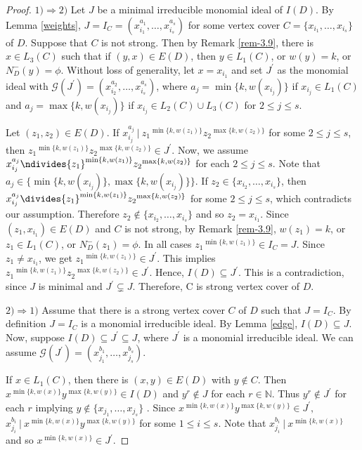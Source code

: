 \documentclass[11pt,reqno]{amsart}
\theoremstyle{definition}
\begin{document}
\begin{proof}
$ 1) \Rightarrow  2)$  Let $ J $ be a minimal irreducible monomial ideal of $ I(D) $. By  Lemma \ref{weights}, $J =I_C= (x^{a_1}_
{i_1} ,\ldots, x^{a_s}_
{i_s})$ for some vertex cover $C = \{x_
{i_1} ,\ldots, x_
{i_s}\}$ of $D$. Suppose that $C$ is not strong. Then by Remark \ref{rem-3.9}, there is $ x \in L_3(C) $ such that if $ (y, x) \in E(D) $, then
$ y   \in L_1(C) $, or   $ w(y) = k $, or $  N_D^-(y) = \phi $. 	 Without loss of generality, let $ x = x_{i_1} $  and set $ J^{\prime} $ as the monomial ideal
with $ \mathcal{G}(J^{\prime}) = ( x_{i_2}^{a_2}, \ldots, x_{i_s}^{a_s} )$,  where $a_j = {\min\{k,  w(x_{i_j}) \}}$   if $  x_{i_j} \in  L_1(C) $ and $a_j =      {\max\{k, w(x_{i_j})\}}$ if $x_{i_j} \in  L_2(C) \cup L_3(C)  $ for $ 2 \leq j \leq s$.


  Let $ (z_1, z_2) \in E(D) $. If $ x_{i_j}^{a_j}
  ~|~  {z_1}^{\min\{k,w(z_1)\}}{z_2}^{\max\{k,w(z_2)\}} $
 for some $ 2 \leq j \leq s $,
then  $   {z_1}^{\min\{k,w(z_1)\}}{z_2}^{\max\{k,w(z_2)\}} \in  J^{\prime}$.
 Now, we assume $ x_{i_j}^{a_j}
 \ndivides  {z_1}^{\min\{k,w(z_1)\}}{z_2}^{\max\{k,w(z_2)\}} $ for each $ 2 \leq j \leq s $.  Note that $a_j \in \{\min\{k,w(x_{i_j})\}, \max\{k,w(x_{i_j})\}    \} $.
If  $ z_2 \in  \{x_{i_2},  \ldots    ,x_{i_s}\}  $, then  $ x_{i_j}^{a_j}
\divides  {z_1}^{\min\{k,w(z_1)\}}{z_2}^{\max\{k,w(z_2)\}} $ for some $ 2 \leq j \leq s $, which contradicts our assumption.  Therefore
 $ z_2 \notin  \{x_{i_2},  \ldots    ,x_{i_s}\}  $ and so  $ z_2 = x_{i_1} $.  Since $ (z_1, x_{i_1}) \in E(D) $ and $C$ is not strong, by Remark \ref{rem-3.9}, $ w(z_1) = k $, or $ z_1 \in L_1(C)  $, or $  N_D^-(z_1) = \phi $. In all cases $ {z_1}^{\min\{k,w(z_1)\}} \in I_C = J $.  Since
 $ z_1 \neq x_{i_1} $, we get $ {z_1}^{\min\{k,w(z_1)\}} \in J^{\prime} $. This implies $ {z_1}^{\min\{k,w(z_1)\}}{z_2}^{\max\{k,w(z_2)\}}
 \in  J^{\prime} $. Hence, $ I(D) \subseteq J^{\prime} $. This is a contradiction, since $ J $ is minimal
 and $ J^{\prime}   \subsetneq J $. Therefore, C is strong vertex cover of $D$.       

$ 2) \Rightarrow  1)$  Assume that there is a strong vertex cover $ C $ of $ D $ such that $ J = I_C $.
By definition $ J = I_C $ is a monomial irreducible ideal. By Lemma \ref{edge},
$ I(D)  \subseteq  J $. Now, suppose $ I(D) \subseteq J^{\prime} \subseteq J $, where $ J^{\prime} $ is a monomial irreducible ideal. We
can assume $ \mathcal{G}(J^{\prime}) = ( x_{j_1}^{b_1}, \ldots, x_{j_s}^{b_s} )$.


If $ x \in L_1(C) $, then there is $ (x, y) \in E(D) $ with $ y \notin C $. Then $ {x}^{\min\{k,w(x)\}}{y}^{\max\{k,w(y)\}} \in I(D) $ and $ y^r  \notin J $
for each $ r \in \mathbb{N} $. Thus $ y^r  \notin J^{\prime}$ for each $ r $ implying $y \notin \{ x_{j_1}, \ldots, x_{j_s} \} $ . 
 Since $ {x}^{\min\{k,w(x)\}}{y}^{\max\{k,w(y)\}} \in   J^{\prime},$ 
 $ x_{j_i}^{b_i}
 ~|~  {x}^{\min\{k,w(x)\}}{y}^{\max\{k,w(y)\}} $ for some $ 1 \leq i \leq s $.  Note that $ 
x_{j_i}^{b_i}  ~|~ {x}^{\min\{k,w(x)\}}$ and so  $ {x}^{\min\{k,w(x)\}}   \in  J^{\prime}$.




\end{proof}
\end{document}
